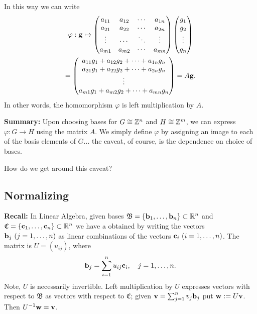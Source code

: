 \documentclass[../algebraNotesMSRI-UP2016.tex]{subfiles}
\begin{document}
\begin{frame}{}{}
In this way we can write
\begin{multline*}
\varphi:\mathbf g \mapsto 
	\begin{pmatrix}
		a_{11} & a_{12} & \cdots & a_{1n} \\
		a_{21} & a_{22} & \cdots & a_{2n} \\
		\vdots & \cdots & \ddots & \vdots \\
		a_{m1} & a_{m2} & \cdots & a_{mn}
		\end{pmatrix}
	\begin{pmatrix}
		g_1 \\
		g_2 \\
		\vdots \\
		g_n\end{pmatrix}
	\\	
	= \begin{pmatrix}
		a_{11}g_1+a_{12}g_2+\cdots +a_{1n}g_n \\
		a_{21}g_1+a_{22}g_2+\cdots +a_{2n}g_n \\
		\vdots \\
		a_{m1}g_1+a_{m2}g_2+\cdots +a_{mn}g_n 
		\end{pmatrix} 
	= A\mathbf g.
\end{multline*}
In other words, the homomorphism $\varphi$ is left multiplication by $A$.  
\end{frame}

\begin{frame}[c]{}{}
\textbf{Summary:} Upon choosing bases for $G\cong \mathbb Z^n$ and $H\cong \mathbb Z^m$, we can express $\varphi:G\to H$ using the matrix $A$.  We simply define $\varphi$ by assigning an image to each of the basis elements of $G$... the caveat, of course, is the dependence on choice of bases.

\smallGap
\begin{que}
How do we get around this caveat?
\end{que}
\end{frame}

\subsection[\subsecname]{Normalizing}\label{subsec:normalizing}
\begin{frame}{\subsecname}
\textbf{Recall:} In Linear Algebra, given bases $\mathfrak B=\{\mathbf b_1,\dots,\mathbf b_n\}\subset \mathbb R^n$ and $\mathfrak C=\{\mathbf c_1,\dots,\mathbf c_n\}\subset \mathbb R^n$ we have a  obtained by writing the vectors $\mathbf b_j\ (j=1,\dots,n)$ as linear combinations of the vectors $\mathbf c_i\ (i=1,\dots,n)$.  The matrix is $U=(u_{ij})$, where
\[
\mathbf b_j=\sum_{i=1}^nu_{ij}\mathbf c_i,\quad j=1,\dots,n.
\]
Note, $U$ is necessarily invertible.  Left multiplication by $U$ expresses vectors with respect to $\mathfrak B$ as vectors with respect to $\mathfrak C$; given $\mathbf v=\sum_{j=1}^nv_j\mathbf b_j$ put $\mathbf w:=U\mathbf v$.  Then $U^{-1}\mathbf w=\mathbf v$.
\end{frame}
\end{document}
